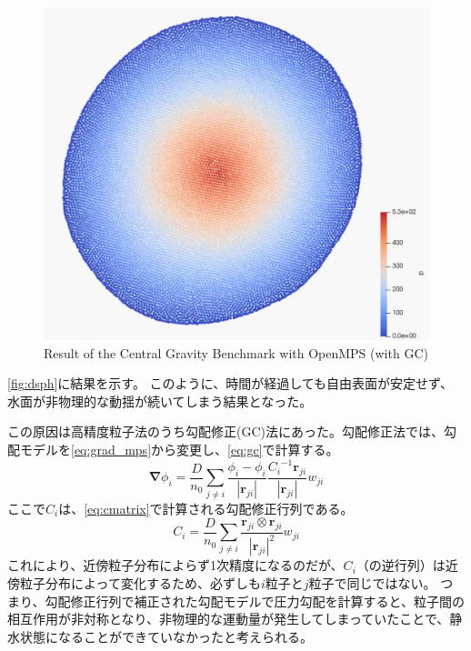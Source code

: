 \begin{figure}
\begin{minipage}{.3 \linewidth}
			\end{minipage}
			\begin{minipage}{.3 \linewidth} \centering
				\includegraphics[clip, width=\linewidth]{img/mpsgc_40.png}
			\end{minipage}
			\caption{Result of the Central Gravity Benchmark with OpenMPS (with GC) \label{fig:mps_gc}}
		\end{figure}
		\cref{fig:dsph}に結果を示す。
		このように、時間が経過しても自由表面が安定せず、水面が非物理的な動揺が続いてしまう結果となった。

		この原因は高精度粒子法のうち勾配修正(GC)法\Cite{ref:Khayyer2011}にあった。勾配修正法では、勾配モデルを\cref{eq:grad_mps}から変更し、\cref{eq:gc}で計算する。
		\begin{equation}
			\mathbf{\nabla} \phi_i = \frac{D}{n_0} \sum_{j \neq i} \frac{\phi_i - \phi_i}{\left| \mathbf{r}_{ji} \right|} \frac{{C_i}^{-1} \mathbf{r}_{ji}}{\left| \mathbf{r}_{ji} \right|} w_{ji} \label{eq:gc}
		\end{equation}
		ここで$C_i$は、\cref{eq:cmatrix}で計算される勾配修正行列である。
		\begin{equation}
			C_i = \frac{D}{n_0} \sum_{j \neq i} \frac{\mathbf{r}_{ji} \otimes \mathbf{r}_{ji}}{{\left| \mathbf{r}_{ji} \right|}^2} w_{ji} \label{eq:cmatrix}
		\end{equation}
		これにより、近傍粒子分布によらず1次精度になるのだが、$C_i$（の逆行列）は近傍粒子分布によって変化するため、必ずしも$i$粒子と$j$粒子で同じではない。
		つまり、勾配修正行列で補正された勾配モデルで圧力勾配を計算すると、粒子間の相互作用が非対称となり、非物理的な運動量が発生してしまっていたことで、静水状態になることができていなかったと考えられる。
		
